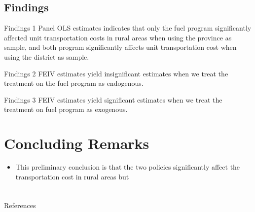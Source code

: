 \documentclass[
11pt,notheorems,compress,hyperref={pdfauthor=Maghfira Ramadhani}
]{beamer}
\begin{document}
\subsection{Findings}
\begin{frame}
    \begin{block}{Findings 1}
        Panel OLS estimates indicates that only the fuel program significantly affected unit transportation costs in rural areas when using the province as sample, and both program significantly affects unit transportation cost when using the district as sample. \hyperlink{POLS}{}\label{POLSclick}
    \end{block}
    \pause\begin{block}{Findings 2}
        FEIV estimates yield insignificant estimates when we treat the treatment on the fuel program as endogenous. \hyperlink{FEIV}{}\label{FEIVclick}
    \end{block}
    \pause\begin{block}{Findings 3}
        FEIV estimates yield significant estimates when we treat the treatment on fuel program as exogenous. \hyperlink{FEIV1}{}\\
    \end{block}
\end{frame}

   

\section{Concluding Remarks}
\begin{frame}
    \begin{itemize}
        \item This preliminary conclusion is that the two policies significantly affect the transportation cost in rural areas but 
    \end{itemize}
\end{frame}

\section{}
\begin{frame}[allowframebreaks]{References}
    
    
\end{frame}
\end{document}
